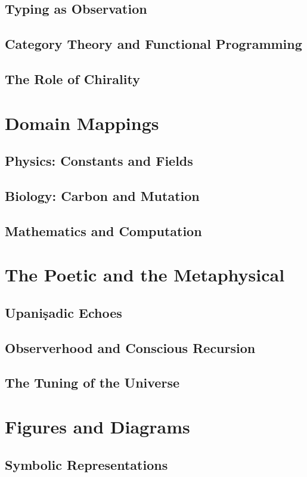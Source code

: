 \documentclass[12pt]{article}
\begin{document}
\subsection{Typing as Observation}
\subsection{Category Theory and Functional Programming}
\subsection{The Role of Chirality}

\section{Domain Mappings}
\subsection{Physics: Constants and Fields}
\subsection{Biology: Carbon and Mutation}
\subsection{Mathematics and Computation}

\section{The Poetic and the Metaphysical}
\subsection{Upaniṣadic Echoes}
\subsection{Observerhood and Conscious Recursion}
\subsection{The Tuning of the Universe}

\section{Figures and Diagrams}
\subsection{Symbolic Representations}
\end{document}
